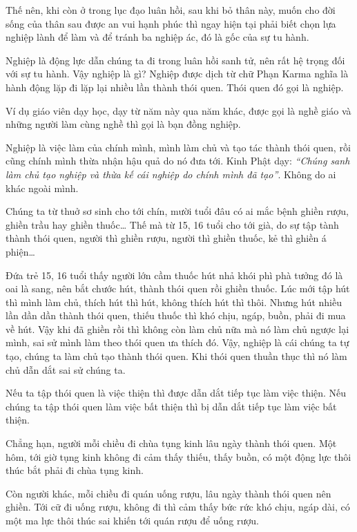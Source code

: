 \documentclass[
  12pt,
  oneside]{book}
\begin{document}
Thế nên, khi còn ở trong lục đạo luân hồi, sau khi bỏ thân này, muốn cho đời sống của thân sau được an vui hạnh phúc thì ngay hiện tại phải biết chọn lựa nghiệp lành để làm và để tránh ba nghiệp ác, đó là gốc của sự tu hành.

Nghiệp là động lực dẫn chúng ta đi trong luân hồi sanh tử, nên rất hệ trọng đối với sự tu hành. Vậy nghiệp là gì? Nghiệp được dịch từ chữ Phạn Karma nghĩa là hành động lặp đi lặp lại nhiều lần thành thói quen. Thói quen đó gọi là nghiệp.

Ví dụ giáo viên dạy học, dạy từ năm này qua năm khác, được gọi là nghề giáo và những người làm cùng nghề thì gọi là bạn đồng nghiệp.

Nghiệp là việc làm của chính mình, mình làm chủ và tạo tác thành thói quen, rồi cũng chính mình thừa nhận hậu quả do nó đưa tới. Kinh Phật dạy: \emph{``Chúng sanh làm chủ tạo nghiệp và thừa kế cái nghiệp do chính mình đã tạo''}. Không do ai khác ngoài mình.

Chúng ta từ thuở sơ sinh cho tới chín, mười tuổi đâu có ai mắc bệnh ghiền rượu, ghiền trầu hay ghiền thuốc\ldots{} Thế mà từ 15, 16 tuổi cho tới già, do sự tập tành thành thói quen, người thì ghiền rượu, người thì ghiền thuốc, kẻ thì ghiền á phiện\ldots{}

Đứa trẻ 15, 16 tuổi thấy người lớn cầm thuốc hút nhả khói phì phà tưởng đó là oai là sang, nên bắt chước hút, thành thói quen rồi ghiền thuốc. Lúc mới tập hút thì mình làm chủ, thích hút thì hút, không thích hút thì thôi. Nhưng hút nhiều lần dần dần thành thói quen, thiếu thuốc thì khó chịu, ngáp, buồn, phải đi mua về hút. Vậy khi đã ghiền rồi thì không còn làm chủ nữa mà nó làm chủ ngược lại mình, sai sử mình làm theo thói quen ưa thích đó. Vậy, nghiệp là cái chúng ta tự tạo, chúng ta làm chủ tạo thành thói quen. Khi thói quen thuần thục thì nó làm chủ dẫn dắt sai sử chúng ta.

Nếu ta tập thói quen là việc thiện thì được dẫn dắt tiếp tục làm việc thiện. Nếu chúng ta tập thói quen làm việc bất thiện thì bị dẫn dắt tiếp tục làm việc bất thiện.

Chẳng hạn, người mỗi chiều đi chùa tụng kinh lâu ngày thành thói quen. Một hôm, tới giờ tụng kinh không đi cảm thấy thiếu, thấy buồn, có một động lực thôi thúc bắt phải đi chùa tụng kinh.

Còn người khác, mỗi chiều đi quán uống rượu, lâu ngày thành thói quen nên ghiền. Tới cữ đi uống rượu, không đi thì cảm thấy bức rức khó chịu, ngáp dài, có một ma lực thôi thúc sai khiến tới quán rượu để uống rượu.
\end{document}
